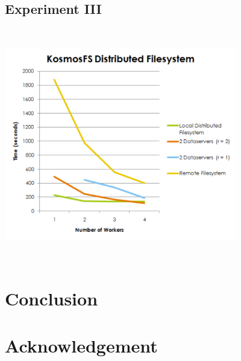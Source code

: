 \documentclass[a4paper,11pt]{article}
\begin{document}
\subsection{Experiment III}
\includegraphics[width=4in,height=4in]{KFSTest.pdf}
\section{Conclusion}
\section{Acknowledgement}

 

\end{document}
